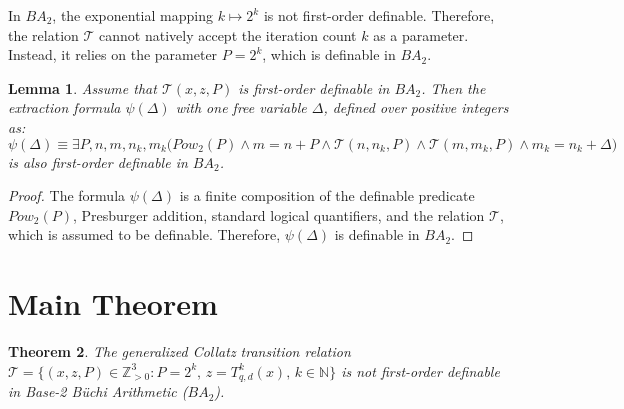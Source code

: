 \documentclass[11pt]{article}
\newtheorem{theorem}{Theorem}
\newtheorem{lemma}[theorem]{Lemma}
\begin{document}
In $BA_2$, the exponential mapping $k \mapsto 2^k$ is not first-order definable. Therefore, the relation $\mathcal{T}$ cannot natively accept the iteration count $k$ as a parameter. Instead, it relies on the parameter $P = 2^k$, which is definable in $BA_2$. \\

\begin{lemma} \label{lem:definability}
Assume that $\mathcal{T}(x, z, P)$ is first-order definable in $BA_2$. Then the extraction formula $\psi(\Delta)$ with one free variable $\Delta$, defined over positive integers as:
$$ \psi(\Delta) \equiv \exists P, n, m, n_k, m_k \Big( Pow_2(P) \land m = n + P \land \mathcal{T}(n, n_k, P) \land \mathcal{T}(m, m_k, P) \land m_k = n_k + \Delta \Big) $$
is also first-order definable in $BA_2$.
\end{lemma}

\begin{proof}
The formula $\psi(\Delta)$ is a finite composition of the definable predicate $Pow_2(P)$, Presburger addition, standard logical quantifiers, and the relation $\mathcal{T}$, which is assumed to be definable. Therefore, $\psi(\Delta)$ is definable in $BA_2$.
\end{proof}

\section{Main Theorem}

\begin{theorem}
The generalized Collatz transition relation $\mathcal{T} = \{(x, z, P) \in \mathbb{Z}_{>0}^3 : P = 2^k, \, z = T_{q,d}^k(x), \, k \in \mathbb{N}\}$ is not first-order definable in Base-2 B\"uchi Arithmetic ($BA_2$).
\end{theorem}
\end{document}
